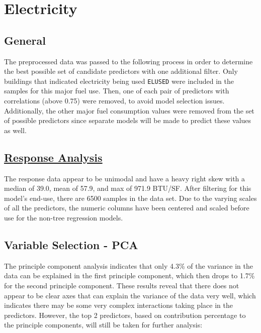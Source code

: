 \section*{Electricity}
\label{sec:electricity}

\subsection{General}

The preprocessed data was passed to the following process in order to determine the best possible set of candidate predictors with one additional filter.  Only buildings that indicated electricity being used \lstinline{ELUSED} were included in the samples for this major fuel use.  Then, one of each pair of predictors with correlations (above 0.75) were removed, to avoid model selection issues. Additionally, the other major fuel consumption values were removed from the set of possible predictors since separate models will be made to predict these values as well.

\subsection{\hyperref[appendix:electricity:response]{Response Analysis}}

The response data appear to be unimodal and have a heavy right skew with a median of 39.0, mean of 57.9, and max of 971.9 BTU/SF.  After filtering for this model's end-use, there are 6500 samples in the data set.  Due to the varying scales of all the predictors, the numeric columns have been centered and scaled before use for the non-tree regression models.

\subsection{Variable Selection - PCA}

The principle component analysis indicates that only 4.3\% of the variance in the data can be explained in the first principle component, which then drops to 1.7\% for the second principle component.  These results reveal that there does not appear to be clear axes that can explain the variance of the data very well, which indicates there may be some very complex interactions taking place in the predictors.  However, the top 2 predictors, based on contribution percentage to the principle components, will still be taken for further analysis:

